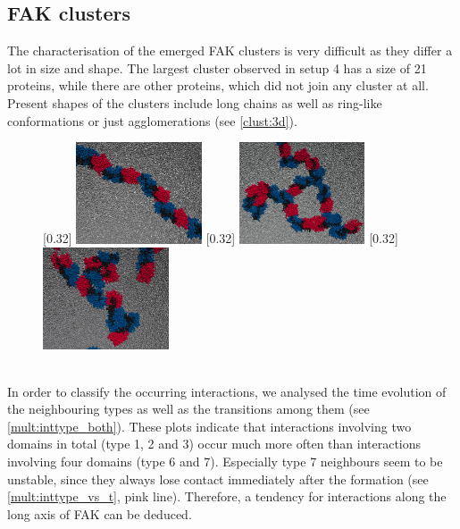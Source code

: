 \subsection{FAK clusters}
\label{mult:oligs}
The characterisation of the emerged FAK clusters is very difficult as they differ a lot in size and shape. The largest cluster observed in setup 4 has a size of 21 proteins, while there are other proteins, which did not join any cluster at all. Present shapes of the clusters include long chains as well as ring-like conformations or just agglomerations (see \autoref{clust:3d}).\\
%
%
%
\begin{figure}[hb]
	\subcaptionbox{\label{clust:3d_chain}}[0.32\textwidth]{
		\includegraphics[height=3cm]{figures/results/fak_chainlike}
	}\hfill%
	\subcaptionbox{\label{clust:3d_ring}}[0.32\textwidth]{
		\includegraphics[height=3cm]{figures/results/fak_circle}
	}\hfill%
	\subcaptionbox{\label{clust:3d_aggl}}[0.32\textwidth]{
		\includegraphics[height=3cm]{figures/results/fak_agglo}
	}
	\label{clust:3d}
\end{figure}
%
%
%
\\
In order to classify the occurring interactions, we analysed the time evolution of the neighbouring types as well as the transitions among them (see \autoref{mult:inttype_both}). These plots indicate that interactions involving two domains in total (type 1, 2 and 3) occur much more often than interactions involving four domains (type 6 and 7). Especially type 7 neighbours seem to be unstable, since they always lose contact immediately after the formation (see \autoref{mult:inttype_vs_t}, pink line). Therefore, a tendency for interactions along the long axis of FAK can be deduced.\\
